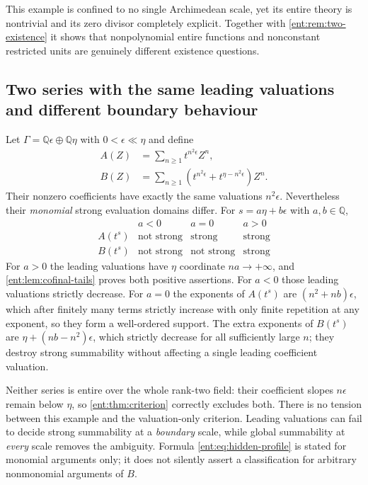 \documentclass[11pt]{article}
\theoremstyle{plain}
\theoremstyle{plain}
\theoremstyle{plain}
\theoremstyle{definition}
\theoremstyle{definition}
\theoremstyle{definition}
\theoremstyle{definition}
\theoremstyle{remark}
\newcommand{\Q}{\mathbb Q}\newcommand{\Z}{\mathbb Z}\newcommand{\N}{\mathbb N}
\begin{document}
This example is confined to no single Archimedean scale, yet its entire
theory is nontrivial and its zero divisor completely explicit. Together with
\cref{ent:rem:two-existence} it shows that nonpolynomial entire functions and
nonconstant restricted units are genuinely different existence questions.

\subsection{Two series with the same leading valuations and different
boundary behaviour}
\label{ent:subsec:hidden-tails}
Let $\Gamma=\Q\epsilon\oplus\Q\eta$ with $0<\epsilon\ll\eta$ and define
\begin{align}
 A(Z)&=\sum_{n\ge1}t^{n^2\epsilon}Z^n,\label{ent:eq:hidden-A}\\
 B(Z)&=\sum_{n\ge1}
       \left(t^{n^2\epsilon}+t^{\eta-n^2\epsilon}\right)Z^n.
       \label{ent:eq:hidden-B}
\end{align}
Their nonzero coefficients have exactly the same valuations $n^2\epsilon$.
Nevertheless their \emph{monomial} strong evaluation domains differ. For
$s=a\eta+b\epsilon$ with $a,b\in\Q$,
\begin{equation}\label{ent:eq:hidden-profile}
 \begin{array}{c|ccc}
 &a<0&a=0&a>0\\\hline
 A(t^s)&\text{not strong}&\text{strong}&\text{strong}\\
 B(t^s)&\text{not strong}&\text{not strong}&\text{strong}
 \end{array}
\end{equation}
For $a>0$ the leading valuations have $\eta$ coordinate $na\to+\infty$, and
\cref{ent:lem:cofinal-tails} proves both positive assertions. For $a<0$ those
leading valuations strictly decrease. For $a=0$ the exponents of $A(t^s)$ are
$(n^2+nb)\epsilon$, which after finitely many terms strictly increase with
only finite repetition at any exponent, so they form a well-ordered support.
The extra exponents of $B(t^s)$ are $\eta+(nb-n^2)\epsilon$, which strictly
decrease for all sufficiently large $n$; they destroy strong summability
without affecting a single leading coefficient valuation.

Neither series is entire over the whole rank-two field: their coefficient
slopes $n\epsilon$ remain below $\eta$, so \cref{ent:thm:criterion} correctly
excludes both. There is no tension between this example and the
valuation-only criterion. Leading valuations can fail to decide strong
summability at a \emph{boundary} scale, while global summability at
\emph{every} scale removes the ambiguity. Formula
\eqref{ent:eq:hidden-profile} is stated for monomial arguments only; it does
not silently assert a classification for arbitrary nonmonomial arguments of
$B$.
\end{document}
